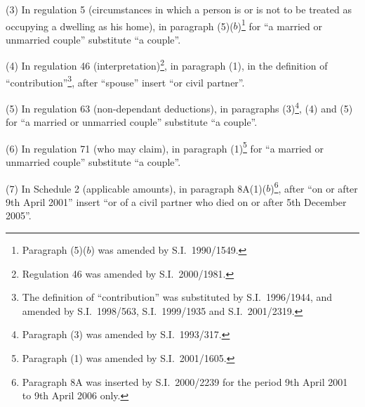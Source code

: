\documentclass[12pt,a4paper]{article}
\begin{document}
(3) In regulation 5 (circumstances in which a person is or is not to be treated as occupying a dwelling as his home), in paragraph (5)($b$)\footnote{Paragraph (5)($b$) was amended by S.I.\ 1990/1549.} for “a married or unmarried couple” substitute “a couple”.

(4) In regulation 46 (interpretation)\footnote{Regulation 46 was amended by S.I.\ 2000/1981.}, in paragraph (1), in the definition of “contribution”\footnote{The definition of “contribution” was substituted by S.I.\ 1996/1944, and amended by S.I.\ 1998/563, S.I.\ 1999/1935 and S.I.\ 2001/2319.}, after “spouse” insert “or civil partner”.

(5) In regulation 63 (non-dependant deductions), in paragraphs (3)\footnote{Paragraph (3) was amended by S.I.\ 1993/317.}, (4) and (5) for “a married or unmarried couple” substitute “a couple”.

(6) In regulation 71 (who may claim), in paragraph (1)\footnote{Paragraph (1) was amended by S.I.\ 2001/1605.} for “a married or unmarried couple” substitute “a couple”.

(7) In Schedule 2 (applicable amounts), in paragraph 8A(1)($b$)\footnote{Paragraph 8A was inserted by S.I.\ 2000/2239 for the period 9th April 2001 to 9th April 2006 only.}, after “on or after 9th April 2001” insert “or of a civil partner who died on or after 5th December 2005”.
\end{document}
